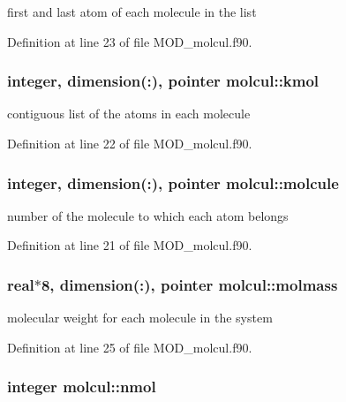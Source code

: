 first and last atom of each molecule in the list 



Definition at line 23 of file M\-O\-D\-\_\-molcul.\-f90.

\hypertarget{classmolcul_a68ecb576dc71334e7f535677a9dc3c76}{
\subsubsection[{kmol}]{\setlength{\rightskip}{0pt plus 5cm}integer, dimension(\-:), pointer molcul\-::kmol}}\label{classmolcul_a68ecb576dc71334e7f535677a9dc3c76}


contiguous list of the atoms in each molecule 



Definition at line 22 of file M\-O\-D\-\_\-molcul.\-f90.

\hypertarget{classmolcul_a392adc76fde1d59a6a1e83c5df1c579e}{
\subsubsection[{molcule}]{\setlength{\rightskip}{0pt plus 5cm}integer, dimension(\-:), pointer molcul\-::molcule}}\label{classmolcul_a392adc76fde1d59a6a1e83c5df1c579e}


number of the molecule to which each atom belongs 



Definition at line 21 of file M\-O\-D\-\_\-molcul.\-f90.

\hypertarget{classmolcul_a7e75c1830e47e428055595f4c8772207}{
\subsubsection[{molmass}]{\setlength{\rightskip}{0pt plus 5cm}real$\ast$8, dimension(\-:), pointer molcul\-::molmass}}\label{classmolcul_a7e75c1830e47e428055595f4c8772207}


molecular weight for each molecule in the system 



Definition at line 25 of file M\-O\-D\-\_\-molcul.\-f90.

\hypertarget{classmolcul_a56c256c5f7cdbf7b7a267b5003c776ec}{
\subsubsection[{nmol}]{\setlength{\rightskip}{0pt plus 5cm}integer molcul\-::nmol}}\label{classmolcul_a56c256c5f7cdbf7b7a267b5003c776ec}


